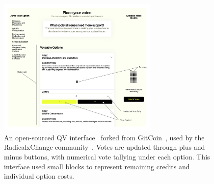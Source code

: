     
    
\begin{figure}[h]
    \centering
    \includegraphics[width=0.7\textwidth]{content/image/curr_interface/rxc_interface_annotated.pdf}
    \caption{An open-sourced QV interface~\cite{RadicalxChangeQuadraticvoting2024} forked from GitCoin~\cite{ReadWhitepaperGitcoin}, used by the RadicalxChange community~\cite{RxC}. Votes are updated through plus and minus buttons, with numerical vote tallying under each option. This interface used small blocks to represent remaining credits and individual option costs.}
    \Description{}
    \label{fig:rcx_interface_annotated}
\end{figure}

